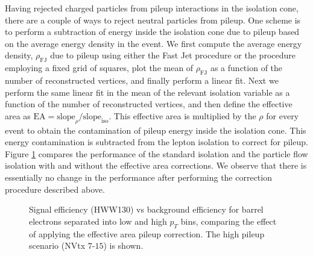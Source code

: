 Having rejected charged particles from pileup interactions in the isolation cone, there are
a couple of ways to reject neutral particles from pileup. One scheme is to perform a 
subtraction of energy inside the isolation cone due to pileup based on the average energy
density in the event. We first compute the average energy density, $\rho_{\mathrm{FJ}}$ due to 
pileup using either the Fast Jet procedure or the procedure employing a fixed grid of squares, 
plot the mean of $\rho_{\mathrm{FJ}}$ as a function of
the number of reconstructed vertices, and finally perform a linear fit. Next we perform the 
same linear fit in the mean of the relevant isolation variable as a function of the number of 
reconstructed vertices, and then define the effective area as 
$\mathrm{EA} = \mathrm{slope}_{\rho} / \mathrm{slope}_{\mathrm{iso}}$. This effective area 
is multiplied by the $\rho$ for every event to obtain the contamination of pileup energy
inside the isolation cone. This energy contamination is subtracted from the lepton isolation
to correct for pileup. Figure \ref{fig:IsoPerformance_EleBarrel_EffectiveAreaCorrection}
compares the performance of the standard isolation and the particle flow isolation with and
without the effective area corrections. We observe that there is essentially no change
in the performance after performing the correction procedure described above.

\begin{figure}[!htbp]
\begin{center}
\caption{Signal efficiency (HWW130) vs background efficiency for barrel electrons separated into 
low and high $p_{T}$ bins, comparing the effect of applying the effective area pileup correction.
The high pileup scenario (NVtx $7$-$15$) is shown.}
\label{fig:IsoPerformance_EleBarrel_EffectiveAreaCorrection}
\end{center}
\end{figure}


